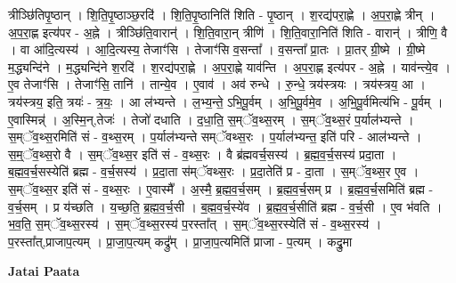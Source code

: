 \documentclass[17pt]{extarticle}
\begin{document}
त्रीञ्छि॑तिपृ॒ष्ठान् । शि॒ति॒पृ॒ष्ठाञ्छ॒रदि॑ । शि॒ति॒पृ॒ष्ठानिति॑ शिति - पृ॒ष्ठान् । श॒रद्य॑परा॒ह्णे । अ॒प॒रा॒ह्णे त्रीन् । अ॒प॒रा॒ह्ण इत्य॑पर - अ॒ह्ने । त्रीञ्छि॑ति॒वारान्॑ । शि॒ति॒वारा॒न् त्रीणि॑ । शि॒ति॒वारा॒निति॑ शिति - वारान्॑ । त्रीणि॒ वै । वा आ॑दि॒त्यस्य॑ । आ॒दि॒त्यस्य॒ तेजाꣳ॑सि । तेजाꣳ॑सि व॒सन्ता᳚ । व॒सन्ता᳚ प्रा॒तः । प्रा॒तर् ग्री॒ष्मे । ग्री॒ष्मे म॒द्ध्यन्दि॑ने । म॒द्ध्यन्दि॑ने श॒रदि॑ । श॒रद्य॑परा॒ह्णे । अ॒प॒रा॒ह्णे याव॑न्ति । अ॒प॒रा॒ह्ण इत्य॑पर - अ॒ह्ने । याव॑न्त्ये॒व । ए॒व तेजाꣳ॑सि । तेजाꣳ॑सि॒ तानि॑ । तान्ये॒व । ए॒वाव॑ । अव॑ रुन्धे । रु॒न्धे॒ त्रय॑स्त्रयः । त्रय॑स्त्रय॒ आ । त्रय॑स्त्रय॒ इति॒ त्रयः॑ - त्र॒यः॒ । आ ल॑भ्यन्ते । ल॒भ्य॒न्ते॒ ऽभि॒पू॒र्वम् । अ॒भि॒पू॒र्वमे॒व । अ॒भि॒॒पू॒र्वमित्य॑भि - पू॒र्वम् । ए॒वास्मिन्न्॑ । अ॒स्मि॒न्,तेजः॑ । तेजो॑ दधाति । द॒धा॒ति॒ स॒म्ॅव॒थ्स॒रम् । स॒म्ॅव॒॒थ्स॒रं प॒र्याल॑भ्यन्ते । स॒म्ॅव॒थ्स॒रमिति॑ सं - व॒थ्स॒रम् । प॒र्याल॑भ्यन्ते सम्ॅवथ्स॒रः । प॒र्याल॑भ्यन्त॒ इति॑ परि - आल॑भ्यन्ते । स॒म्॒ॅव॒थ्स॒रो वै । स॒म्ॅव॒थ्स॒र इति॑ सं - व॒थ्स॒रः । वै ब्र॑ह्मवर्च॒सस्य॑ । ब्र॒ह्म॒व॒र्च॒सस्य॑ प्रदा॒ता । ब॒ह्म॒व॒र्च॒सस्येति॑ ब्रह्म - व॒र्च॒सस्य॑ । प्र॒दा॒ता स॑म्ॅवथ्स॒रः । प्र॒दा॒तेति॑ प्र - दा॒ता । स॒म्ॅव॒थ्स॒र ए॒व । स॒म्ॅव॒थ्स॒र इति॑ सं - व॒थ्स॒रः । ए॒वास्मै᳚ । अ॒स्मै॒ ब्र॒ह्म॒व॒र्च॒सम् । ब्र॒ह्म॒व॒र्च॒सम् प्र । ब्र॒ह्म॒व॒र्च॒समिति॑ ब्रह्म - व॒र्च॒सम् । प्र य॑च्छति । य॒च्छ॒ति॒ ब्र॒ह्म॒व॒र्च॒सी । ब॒॒ह्म॒व॒र्च॒स्ये॑व । ब्र॒ह्म॒व॒र्च॒सीति॑ ब्रह्म - व॒र्च॒सी । ए॒व भ॑वति । भ॒व॒ति॒ स॒म्ॅव॒थ्स॒रस्य॑ । स॒म्ॅव॒थ्स॒रस्य॑ प॒रस्ता᳚त् । स॒म्ॅव॒थ्स॒रस्येति॑ सं - व॒थ्स॒रस्य॑ । प॒रस्ता᳚त्,प्राजाप॒त्यम् । प्रा॒जा॒प॒त्यम् कद्रु᳚म् । प्रा॒जा॒प॒त्यमिति॑ प्राजा - प॒त्यम् । कद्रु॒मा \newline

\textbf{Jatai Paata} \newline
\end{document}
